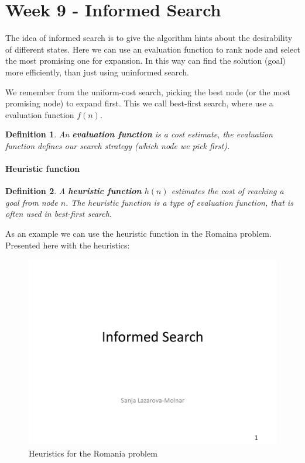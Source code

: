 \documentclass{article}
\newtheorem{definition}{Definition}[section]
\begin{document}
\section{Week 9 - Informed Search}%
\label{sec:1_march_informed_search}
The idea of informed search is to give the algorithm hints about the desirability
of different states. Here we can use an evaluation function to rank node and
select the most promising one for expansion. In this way can find the solution
(goal) more efficiently, than just using uninformed search\cite[p.
92]{book:artificial_intelligence_modern_approach}.

We remember from the uniform-cost search, picking the best node (or the most
promising node) to expand first. This we call best-first search, where use a
evaluation function $f(n)$.
\begin{definition}
An \textbf{evaluation function } is a cost estimate, the evaluation function defines our
search strategy (which node we pick first).
\end{definition}

\paragraph{Heuristic function}%
\label{par:heuristic_function}

\begin{definition}
  A \textbf{heuristic function} $h(n)$ estimates the cost of reaching a goal
  from node $n$. The heuristic function is a type of evaluation function, that
  is often used in best-first search.
\end{definition}

As an example we can use the heuristic function in the Romaina problem.
Presented here with the heuristics:
\begin{figure}[h]
  \centering
  \includegraphics[width=0.8\linewidth,
  page=4]{../presentations/w9_lec04_informed_search_sanja_2021.pdf}
  \caption{Heuristics for the Romania problem}%
  \label{fig:romania_problem_heuristics}
\end{figure}
\end{document}
